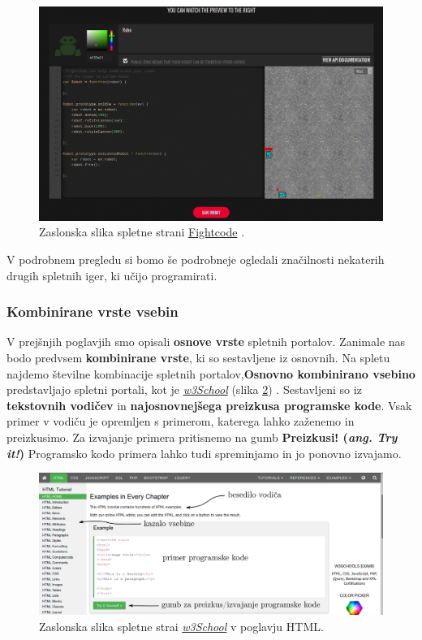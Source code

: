 \begin{figure}[h!]
    \includegraphics [width=1\linewidth, keepaspectratio =
    1] {./images/sc_web/fightRobot_01.jpg}
    \caption{Zaslonska slika spletne strani
      {\href{http://fightcodegame.com/}{Fightcode}}
      \cite{web:fightcode}.}
    \label{fig:scr:web:w3school}
\end{figure}

V podrobnem pregledu si bomo še podrobneje ogledali značilnosti nekaterih drugih
spletnih iger, ki učijo programirati.

\subsubsection{Kombinirane vrste vsebin}
\label{sec:kombinirane_vrste_vsebin}

V prejšnjih poglavjih smo opisali \textbf{osnove vrste} spletnih
portalov. Zanimale nas bodo predvsem \textbf{kombinirane vrste}, ki so
sestavljene iz osnovnih. Na spletu najdemo številne kombinacije
spletnih portalov,\textbf{Osnovno kombinirano vsebino} predstavljajo
spletni portali, kot je
\emph{\href{http://www.w3schools.com/}{w3School}} (slika
\ref{fig:scr:web:w3school}) \cite{web:w3school}. Sestavljeni so iz
\textbf{tekstovnih vodičev} in \textbf{najosnovnejšega preizkusa
  programske kode}. Vsak primer v vodiču je opremljen s primerom,
katerega lahko zaženemo in preizkusimo. Za izvajanje primera
pritisnemo na gumb \textbf{Preizkusi!  (\emph{ang. Try it!})}
Programsko kodo primera lahko tudi spreminjamo in jo ponovno izvajamo.

\begin{figure}[h!]
    \includegraphics [width=1\linewidth, keepaspectratio =
    1] {./images/sc_web/w3school.jpg}
    \caption{Zaslonska slika spletne strai
      \emph{\href{http://www.w3schools.com/}{w3School}}
      \cite{web:w3school} v poglavju HTML.}
    \label{fig:scr:web:w3school}
\end{figure}

